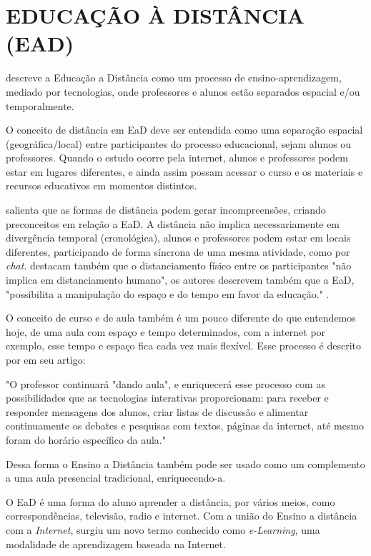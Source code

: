 \section{EDUCAÇÃO À DISTÂNCIA (EAD)}

 descreve a Educação a Distância como um processo de ensino-aprendizagem, mediado por tecnologias, onde professores e alunos estão separados espacial e/ou temporalmente.
\par
O conceito de distância em EaD deve ser entendida como uma separação espacial (geográfica/local) entre participantes do processo educacional, sejam alunos ou professores. Quando o estudo ocorre pela internet, alunos e professores podem estar em lugares diferentes, e ainda assim possam acessar o curso e os materiais e recursos educativos em momentos distintos.
\par
{} salienta que as formas de distância podem gerar incompreensões, criando preconceitos em relação a EaD. A distância não implica necessariamente em divergência temporal (cronológica), alunos e professores podem estar em locais diferentes, participando de forma síncrona de uma mesma atividade, como por \textit{chat}.   destacam também que o distanciamento físico entre os participantes "não implica em distanciamento humano", os autores descrevem também que a EaD, "possibilita a manipulação do espaço e do tempo em favor da educação." .
\par
O conceito de curso e de aula também é um pouco diferente do que entendemos hoje, de uma aula com espaço e tempo determinados, com a internet por exemplo, esse tempo e espaço fica cada vez mais flexível. Esse processo é descrito por  em seu artigo:
\begin{citacao}
  "O professor continuará "dando aula", e enriquecerá esse processo com as possibilidades que as tecnologias interativas proporcionam: para receber e responder mensagens dos alunos, criar listas de discussão e alimentar continuamente os debates e pesquisas com textos, páginas da internet, até mesmo foram do horário específico da aula."
\end{citacao}
\par
Dessa forma o Ensino a Distância também pode ser usado como um complemento a uma aula presencial tradicional, enriquecendo-a.
\par
O EaD é uma forma do aluno aprender a distância, por vários meios, como correspondências, televisão, radio e internet. Com a união do Ensino a distância com a \textit{Internet}, surgiu um novo termo conhecido como \textit{e-Learning}, uma modalidade de aprendizagem baseada na Internet.

